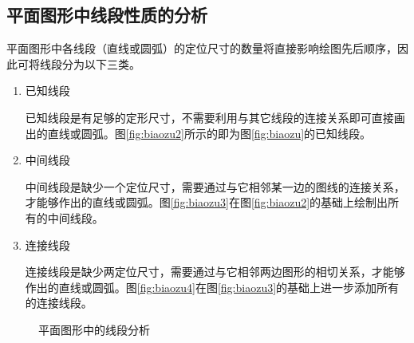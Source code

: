 \subsection{平面图形中线段性质的分析}
平面图形中各线段（直线或圆弧）的定位尺寸的数量将直接影响绘图先后顺序，因此可将线段分为以下三类。

\begin{enumerate}
\item 已知线段

已知线段是有足够的定形尺寸，不需要利用与其它线段的连接关系即可直接画出的直线或圆弧。图\ref{fig:biaozu2}所示的即为图\ref{fig:biaozu}的已知线段。

\item 中间线段

中间线段是缺少一个定位尺寸，需要通过与它相邻某一边的图线的连接关系，才能够作出的直线或圆弧。图\ref{fig:biaozu3}在图\ref{fig:biaozu2}的基础上绘制出所有的中间线段。
\item 连接线段

连接线段是缺少两定位尺寸，需要通过与它相邻两边图形的相切关系，才能够作出的直线或圆弧。图\ref{fig:biaozu4}在图\ref{fig:biaozu3}的基础上进一步添加所有的连接线段。
\end{enumerate}

\noindent
\begin{figure}[htbp]
\centering
{}\hspace{20pt}
\hspace{20pt}
\caption{平面图形中的线段分析}
\end{figure}
\indent
\clearpage
\endinput